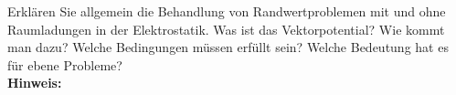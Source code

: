 \begin{question}[section=3,subsection=31,name={Elektrostatik},difficulty=3,type=mdl,mode=exm,tags={}]
	Erklären Sie allgemein die Behandlung von Randwertproblemen mit und ohne Raumladungen in der Elektrostatik. Was ist das Vektorpotential? Wie kommt man dazu? Welche Bedingungen müssen erfüllt sein? Welche Bedeutung hat es für ebene Probleme?
	\\ \textbf{Hinweis:}\\
	
\end{question}
\begin{solution}
	
\end{solution}